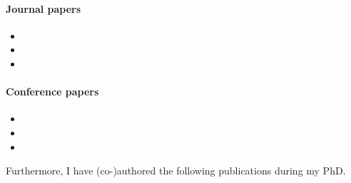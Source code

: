 \begin{refsection}[ownpubs]
    \small
    
    \paragraph{Journal papers}
    \begin{itemize}[label=--]
        \item {}
        \item {}
        \item {}
    \end{itemize}
    
    \paragraph{Conference papers}
    \begin{itemize}[label=--]
        \item {}
        \item {}
        \item {}
    \end{itemize}
\end{refsection}

\noindent Furthermore, I have (co-)authored the following publications during my PhD.%

